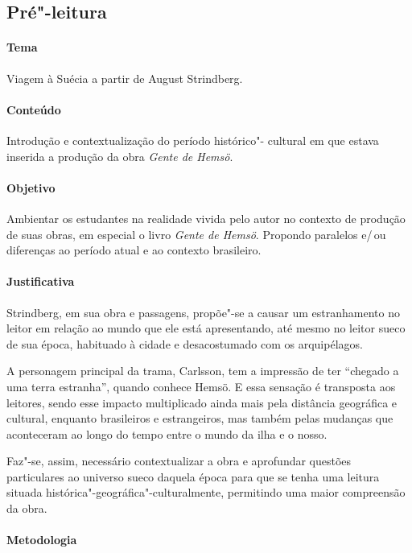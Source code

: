 \documentclass[12pt]{extarticle}
\begin{document}
\subsection{Pré"-leitura}

\paragraph{Tema} Viagem à Suécia a partir de August Strindberg.

\paragraph{Conteúdo} Introdução e contextualização do período histórico"-
cultural em que estava inserida a produção da obra \emph{Gente de Hemsö}.

\paragraph{Objetivo} Ambientar os estudantes na realidade vivida pelo 
autor no contexto de produção de suas obras, em especial o livro 
\emph{Gente de Hemsö}. Propondo paralelos e/\,ou diferenças ao período 
atual e ao contexto brasileiro. 

\paragraph{Justificativa} Strindberg, em sua obra e passagens, propõe"-se 
a causar um estranhamento no leitor em relação ao mundo que ele está
apresentando, até mesmo no leitor sueco de sua época, habituado à
cidade e desacostumado com os arquipélagos.

A personagem principal da trama, Carlsson, tem a impressão
de ter “chegado a uma terra estranha”, quando conhece Hemsö. E essa 
sensação é transposta aos leitores, sendo esse impacto multiplicado ainda 
mais pela distância geográfica e cultural, enquanto brasileiros e 
estrangeiros, mas também pelas mudanças que aconteceram ao longo do tempo 
entre o mundo da ilha e o nosso.

Faz"-se, assim, necessário contextualizar a obra e aprofundar questões 
particulares ao universo sueco daquela época para que se tenha uma leitura 
situada histórica"-geográfica"-culturalmente, permitindo uma maior 
compreensão da obra. 

\paragraph{Metodologia}
\end{document}
